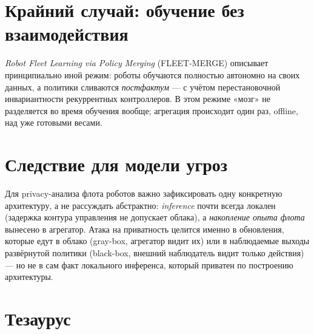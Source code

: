 \documentclass[11pt]{article}
\begin{document}
\section{Крайний случай: обучение без взаимодействия}

\emph{Robot Fleet Learning via Policy Merging} (FLEET-MERGE) \cite{fleetmerge2023}
описывает принципиально иной режим: роботы обучаются полностью автономно на своих
данных, а политики сливаются \emph{постфактум} — с учётом перестановочной инвариантности
рекуррентных контроллеров. В этом режиме «мозг» не разделяется во время обучения
вообще; агрегация происходит один раз, offline, над уже готовыми весами.

\section{Следствие для модели угроз}

Для privacy-анализа флота роботов важно зафиксировать одну конкретную архитектуру, а
не рассуждать абстрактно: \emph{inference} почти всегда локален (задержка контура
управления не допускает облака), а \emph{накопление опыта флота} вынесено в
агрегатор. Атака на приватность целится именно в обновления, которые едут в облако
(gray-box, агрегатор видит их) или в наблюдаемые выходы развёрнутой политики
(black-box, внешний наблюдатель видит только действия) — но не в сам факт локального
инференса, который приватен по построению архитектуры.

\section{Тезаурус}
\end{document}

